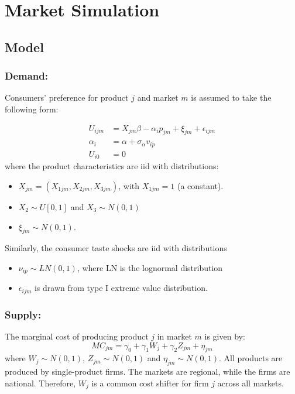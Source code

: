 \documentclass[12pt ]{article}
\providecommand{\DIFaddend}{} %
\begin{document}
\DIFaddend \section{Market Simulation}

\subsection{Model}
\subsubsection{Demand:}
Consumers' preference for product $j$ and market $m$ is assumed to
take the following form:

\begin{align}
U_{ijm} &=X_{jm} \beta - \alpha_i p_{jm} + \xi_{jm} + \epsilon_{ijm} \nonumber\\
\alpha_i &= \alpha+\sigma_{\alpha} v_{ip}\nonumber\\
U_{i0} &= 0
\end{align}
where the product characteristics are iid with distributions:
\begin{itemize}
\item $X_{jm}=(X_{1jm}, X_{2jm}, X_{3jm})$, with $X_{1jm}=1$ (a constant).
\item $X_2\sim U[0,1]$ and $X_3\sim N(0,1)$
\item $\xi_{jm}\sim N(0,1)$.
\end{itemize}

Similarly, the consumer taste shocks are iid with distributions
\begin{itemize}
\item $\nu_{ip}\sim LN(0,1)$, where LN is the lognormal distribution
\item $\epsilon_{ijm}$ is drawn from type I extreme value distribution.
\end{itemize}

\subsubsection{Supply:}
The marginal cost of producing product $j$ in market $m$ is given by:
\begin{equation}
MC_{jm}=\gamma_0+\gamma_1 W_{j}+\gamma_2Z_{jm} +\eta_{jm}
\end{equation}
where $W_j \sim N(0,1)$, $Z_{jm}\sim N(0,1)$ and $\eta_{jm} \sim
N(0,1)$. All products are produced by single-product firms. The
markets are regional, while the firms are national. Therefore, $W_j$
is a common cost shifter for firm $j$ across all markets.
\end{document}
